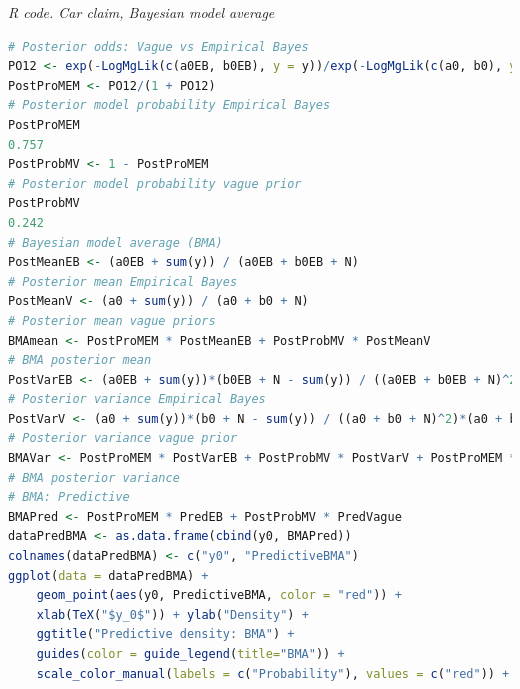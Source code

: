 \begin{enumerate}[leftmargin=*]
\begin{tcolorbox}[enhanced,width=4.67in,center upper,
	fontupper=\large\bfseries,drop shadow southwest,sharp corners]
	\textit{R code. Car claim, Bayesian model average}
	\begin{VF}
		\begin{lstlisting}[language=R]
# Posterior odds: Vague vs Empirical Bayes
PO12 <- exp(-LogMgLik(c(a0EB, b0EB), y = y))/exp(-LogMgLik(c(a0, b0), y = y))
PostProMEM <- PO12/(1 + PO12) 
# Posterior model probability Empirical Bayes
PostProMEM
0.757
PostProbMV <- 1 - PostProMEM 
# Posterior model probability vague prior
PostProbMV
0.242
# Bayesian model average (BMA)
PostMeanEB <- (a0EB + sum(y)) / (a0EB + b0EB + N) 
# Posterior mean Empirical Bayes 
PostMeanV <- (a0 + sum(y)) / (a0 + b0 + N) 
# Posterior mean vague priors
BMAmean <- PostProMEM * PostMeanEB + PostProbMV * PostMeanV  
# BMA posterior mean
PostVarEB <- (a0EB + sum(y))*(b0EB + N - sum(y)) / ((a0EB + b0EB + N)^2)*(a0EB + b0EB + N -1) 
# Posterior variance Empirical Bayes
PostVarV <- (a0 + sum(y))*(b0 + N - sum(y)) / ((a0 + b0 + N)^2)*(a0 + b0 + N -1) 
# Posterior variance vague prior 
BMAVar <- PostProMEM * PostVarEB + PostProbMV * PostVarV + PostProMEM * (PostMeanEB - BMAmean)^2 + PostProbMV * (PostMeanV - BMAmean)^2
# BMA posterior variance   
# BMA: Predictive
BMAPred <- PostProMEM * PredEB + PostProbMV * PredVague    
dataPredBMA <- as.data.frame(cbind(y0, BMAPred))
colnames(dataPredBMA) <- c("y0", "PredictiveBMA")
ggplot(data = dataPredBMA) + 
	geom_point(aes(y0, PredictiveBMA, color = "red")) +  
	xlab(TeX("$y_0$")) + ylab("Density") +
	ggtitle("Predictive density: BMA") +
	guides(color = guide_legend(title="BMA")) +
	scale_color_manual(labels = c("Probability"), values = c("red")) + scale_x_continuous(breaks=seq(0,1,by=1))			
\end{lstlisting}
\end{VF}
\end{tcolorbox}


\end{enumerate}
